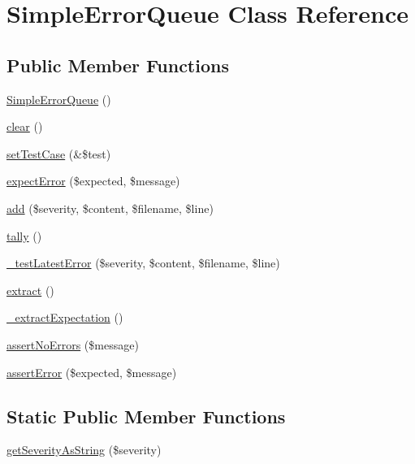 \hypertarget{class_simple_error_queue}{
\section{SimpleErrorQueue Class Reference}
\label{class_simple_error_queue}
}
\subsection*{Public Member Functions}
\begin{DoxyCompactItemize}
\item 
\hyperlink{class_simple_error_queue_aefbdb398de53916724572d3432000e80}{SimpleErrorQueue} ()
\item 
\hyperlink{class_simple_error_queue_a35fde0c9340bed6665ac8a16d66f9501}{clear} ()
\item 
\hyperlink{class_simple_error_queue_a300faf86411587f253d3bf21203ab0ce}{setTestCase} (\&\$test)
\item 
\hyperlink{class_simple_error_queue_a44aac221d1d5eee6a81d84d57330b2b8}{expectError} (\$expected, \$message)
\item 
\hyperlink{class_simple_error_queue_adc13ee1f476b5ec158e3681fffa83421}{add} (\$severity, \$content, \$filename, \$line)
\item 
\hyperlink{class_simple_error_queue_a7349f2d81db012130fa9e792077caa76}{tally} ()
\item 
\hyperlink{class_simple_error_queue_a434a9249cf5f11f3450aa63ccb40e9dc}{\_\-testLatestError} (\$severity, \$content, \$filename, \$line)
\item 
\hyperlink{class_simple_error_queue_a32d8279b377c3cfbcacbb9ac797c9297}{extract} ()
\item 
\hyperlink{class_simple_error_queue_a965965682c3d7774271034d100a3721f}{\_\-extractExpectation} ()
\item 
\hyperlink{class_simple_error_queue_a87cf536e2597e0a6c2551fcdde27492d}{assertNoErrors} (\$message)
\item 
\hyperlink{class_simple_error_queue_a33b8d8d7f89b97018a495032362a9897}{assertError} (\$expected, \$message)
\end{DoxyCompactItemize}
\subsection*{Static Public Member Functions}
\begin{DoxyCompactItemize}
\item 
\hyperlink{class_simple_error_queue_a686f876e93208736cee9fd57dc8223d9}{getSeverityAsString} (\$severity)
\end{DoxyCompactItemize}
